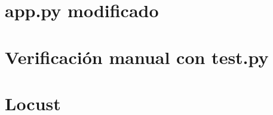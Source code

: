 \documentclass[12pt, a4paper]{article}
\begin{document}
\newpage
\section{app.py modificado} \label{anexo:app.py}
\vspace{1cm}

\vspace{1cm}

\newpage
\section{Verificación manual con test.py} \label{anexo:test.py}
\vspace{1cm}

\vspace{1cm}

\newpage
\section{Locust} \label{anexo:locust.py}
\vspace{1cm}

\vspace{1cm}
\end{document}
